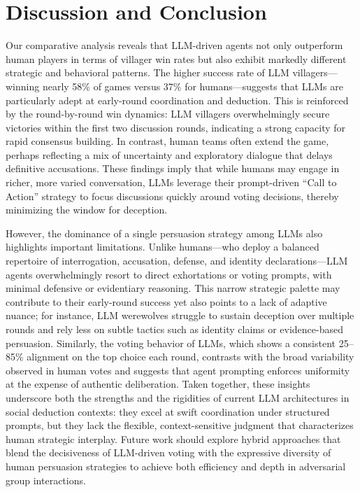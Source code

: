 \documentclass[
  letterpaper,
  DIV=11,
  numbers=noendperiod,
  oneside]{scrreprt}
\begin{document}
\chapter{Discussion and Conclusion}\label{discussion-and-conclusion}

Our comparative analysis reveals that LLM-driven agents not only
outperform human players in terms of villager win rates but also exhibit
markedly different strategic and behavioral patterns. The higher success
rate of LLM villagers---winning nearly 58\% of games versus 37\% for
humans---suggests that LLMs are particularly adept at early-round
coordination and deduction. This is reinforced by the round-by-round win
dynamics: LLM villagers overwhelmingly secure victories within the first
two discussion rounds, indicating a strong capacity for rapid consensus
building. In contrast, human teams often extend the game, perhaps
reflecting a mix of uncertainty and exploratory dialogue that delays
definitive accusations. These findings imply that while humans may
engage in richer, more varied conversation, LLMs leverage their
prompt-driven ``Call to Action'' strategy to focus discussions quickly
around voting decisions, thereby minimizing the window for deception.

However, the dominance of a single persuasion strategy among LLMs also
highlights important limitations. Unlike humans---who deploy a balanced
repertoire of interrogation, accusation, defense, and identity
declarations---LLM agents overwhelmingly resort to direct exhortations
or voting prompts, with minimal defensive or evidentiary reasoning. This
narrow strategic palette may contribute to their early-round success yet
also points to a lack of adaptive nuance; for instance, LLM werewolves
struggle to sustain deception over multiple rounds and rely less on
subtle tactics such as identity claims or evidence-based persuasion.
Similarly, the voting behavior of LLMs, which shows a consistent
25--85\% alignment on the top choice each round, contrasts with the
broad variability observed in human votes and suggests that agent
prompting enforces uniformity at the expense of authentic deliberation.
Taken together, these insights underscore both the strengths and the
rigidities of current LLM architectures in social deduction contexts:
they excel at swift coordination under structured prompts, but they lack
the flexible, context-sensitive judgment that characterizes human
strategic interplay. Future work should explore hybrid approaches that
blend the decisiveness of LLM-driven voting with the expressive
diversity of human persuasion strategies to achieve both efficiency and
depth in adversarial group interactions.
\end{document}
